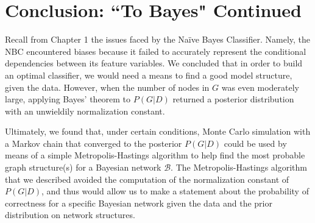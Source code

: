 \documentclass[12pt,twoside]{reedthesis}
\begin{document}
		\section{Conclusion: ``To Bayes" Continued}
			Recall from Chapter 1 the issues faced by the Na\"{i}ve Bayes Classifier. Namely, the NBC encountered biases because it failed to accurately represent the conditional dependencies between its feature variables. 
			We concluded that in order to build an optimal classifier, we would need a means to find a good model structure, given the data. 
			However, when the number of nodes in $G$ was even moderately large, applying Bayes' theorem to $P(G | D)$ returned a posterior distribution with an unwieldily normalization constant. 
			
			Ultimately, we found that, under certain conditions, Monte Carlo simulation with a Markov chain that converged to the posterior $P(G | D)$ could be used by means of a simple Metropolis-Hastings algorithm to help find the most probable graph structure(s) for a Bayesian network $\mathcal{B}$. 
			The Metropolis-Hastings algorithm that we described avoided the computation of the normalization constant of $P(G | D)$, and thus would allow us to make a statement about the probability of correctness for a specific Bayesian network given the data and the prior distribution on network structures.
			
			
									


\end{document}
